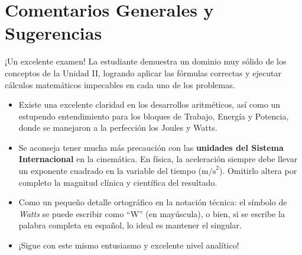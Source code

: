 \documentclass[12pt,letterpaper]{article}
\begin{document}
\section*{Comentarios Generales y Sugerencias}
¡Un excelente examen! La estudiante demuestra un dominio muy sólido de los conceptos de la Unidad II, logrando aplicar las fórmulas correctas y ejecutar cálculos matemáticos impecables en cada uno de los problemas.
\begin{itemize}
    \item Existe una excelente claridad en los desarrollos aritméticos, así como un estupendo entendimiento para los bloques de Trabajo, Energía y Potencia, donde se manejaron a la perfección los Joules y Watts.
    \item Se aconseja tener mucha más precaución con las \textbf{unidades del Sistema Internacional} en la cinemática. En física, la aceleración siempre debe llevar un exponente cuadrado en la variable del tiempo ($\text{m/s}^2$). Omitirlo altera por completo la magnitud clínica y científica del resultado.
    \item Como un pequeño detalle ortográfico en la notación técnica: el símbolo de \textit{Watts} se puede escribir como ``W'' (en mayúscula), o bien, si se escribe la palabra completa en español, lo ideal es mantener el singular.
    \item ¡Sigue con este mismo entusiasmo y excelente nivel analítico!
\end{itemize}
\end{document}
